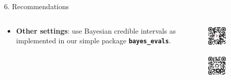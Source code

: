 \documentclass[final]{beamer}
\newlength{\colwidth}
\begin{document}
\begin{frame}[fragile]
\begin{columns}[t]
\begin{column}{\colwidth}
\begin{alertblock}{6. Recommendations}
\begin{columns}
\begin{column}{0.7\textwidth}
\begin{itemize}
          \item \textbf{Other settings}: use Bayesian credible intervals as implemented in our simple package \textbf{\texttt{bayes\_evals}}.
        \end{itemize}
      \end{column}
      \begin{column}{0.3\textwidth}
        \vspace{1em}
        \begin{figure}
          \centering
          \includegraphics[width=0.6\textwidth]{fig/arxiv_qr.png}
        \end{figure}

        \vspace{0.5em}
      
        \begin{figure}
          \centering
          \includegraphics[width=0.6\textwidth]{fig/github_qr.png}
        \end{figure}
      \end{column}
    \end{columns}


\end{alertblock}
\end{column}
\end{columns}
\end{frame}
\end{document}
